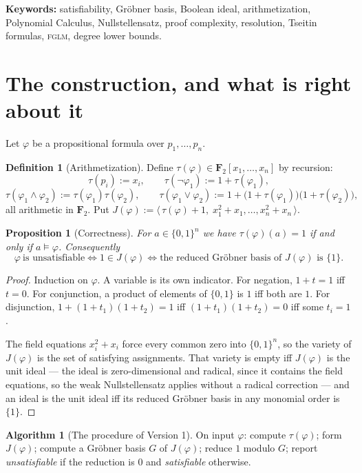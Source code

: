 \documentclass[11pt]{article}
\theoremstyle{plain}
\newtheorem{proposition}[theorem]{Proposition}
\theoremstyle{definition}
\newtheorem{definition}[theorem]{Definition}
\newtheorem{algorithm}[theorem]{Algorithm}
\theoremstyle{remark}
\newcommand{\FF}{\mathbf{F}_{2}}
\begin{document}
\medskip
\noindent\textbf{Keywords:} satisfiability, Gr\"obner basis, Boolean ideal,
arithmetization, Polynomial Calculus, Nullstellensatz, proof complexity,
resolution, Tseitin formulas, \textsc{fglm}, degree lower bounds.

\section{The construction, and what is right about it}

Let $\varphi$ be a propositional formula over $p_{1},\dots,p_{n}$.

\begin{definition}[Arithmetization]\label{def:tau}
Define $\tau(\varphi)\in\FF[x_{1},\dots,x_{n}]$ by recursion:
\[
\tau(p_{i}):=x_{i},\qquad \tau(\neg\varphi_{1}):=1+\tau(\varphi_{1}),
\]
\[
\tau(\varphi_{1}\wedge\varphi_{2}):=\tau(\varphi_{1})\tau(\varphi_{2}),
\qquad
\tau(\varphi_{1}\vee\varphi_{2}):=1+\bigl(1+\tau(\varphi_{1})\bigr)\bigl(1+\tau(\varphi_{2})\bigr),
\]
all arithmetic in $\FF$. Put
$J(\varphi):=\langle\,\tau(\varphi)+1,\;x_{1}^{2}+x_{1},\dots,x_{n}^{2}+x_{n}\,\rangle$.
\end{definition}

\begin{proposition}[Correctness]\label{prop:correct}
For $a\in\{0,1\}^{n}$ we have $\tau(\varphi)(a)=1$ if and only if
$a\models\varphi$. Consequently
\[
\varphi\ \text{is unsatisfiable}
\iff 1\in J(\varphi)
\iff \text{the reduced Gr\"obner basis of }J(\varphi)\text{ is }\{1\}.
\]
\end{proposition}

\begin{proof}
Induction on $\varphi$. A variable is its own indicator. For negation, $1+t=1$
iff $t=0$. For conjunction, a product of elements of $\{0,1\}$ is $1$ iff both
are $1$. For disjunction, $1+(1+t_{1})(1+t_{2})=1$ iff $(1+t_{1})(1+t_{2})=0$
iff some $t_{i}=1$.

The field equations $x_{i}^{2}+x_{i}$ force every common zero into
$\{0,1\}^{n}$, so the variety of $J(\varphi)$ is the set of satisfying
assignments. That variety is empty iff $J(\varphi)$ is the unit ideal --- the
ideal is zero-dimensional and radical, since it contains the field equations,
so the weak Nullstellensatz applies without a radical correction --- and an
ideal is the unit ideal iff its reduced Gr\"obner basis in any monomial order
is $\{1\}$.
\end{proof}

\begin{algorithm}[The procedure of Version 1]\label{alg:v1}
On input $\varphi$: compute $\tau(\varphi)$; form $J(\varphi)$; compute a
Gr\"obner basis $G$ of $J(\varphi)$; reduce $1$ modulo $G$; report
\emph{unsatisfiable} if the reduction is $0$ and \emph{satisfiable} otherwise.
\end{algorithm}
\end{document}
